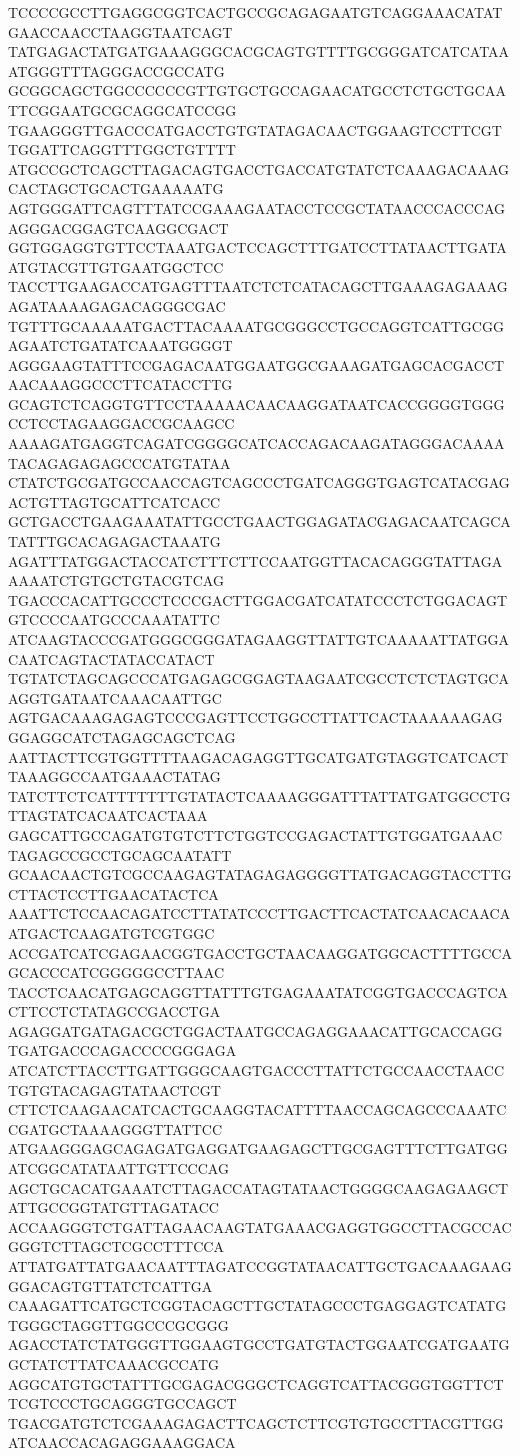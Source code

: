 TCCCCGCCTTGAGGCGGTCACTGCCGCAGAGAATGTCAGGAAACATATGAACCAACCTAAGGTAATCAGT
TATGAGACTATGATGAAAGGGCACGCAGTGTTTTGCGGGATCATCATAAATGGGTTTAGGGACCGCCATG
GCGGCAGCTGGCCCCCCGTTGTGCTGCCAGAACATGCCTCTGCTGCAATTCGGAATGCGCAGGCATCCGG
TGAAGGGTTGACCCATGACCTGTGTATAGACAACTGGAAGTCCTTCGTTGGATTCAGGTTTGGCTGTTTT
ATGCCGCTCAGCTTAGACAGTGACCTGACCATGTATCTCAAAGACAAAGCACTAGCTGCACTGAAAAATG
AGTGGGATTCAGTTTATCCGAAAGAATACCTCCGCTATAACCCACCCAGAGGGACGGAGTCAAGGCGACT
GGTGGAGGTGTTCCTAAATGACTCCAGCTTTGATCCTTATAACTTGATAATGTACGTTGTGAATGGCTCC
TACCTTGAAGACCATGAGTTTAATCTCTCATACAGCTTGAAAGAGAAAGAGATAAAAGAGACAGGGCGAC
TGTTTGCAAAAATGACTTACAAAATGCGGGCCTGCCAGGTCATTGCGGAGAATCTGATATCAAATGGGGT
AGGGAAGTATTTCCGAGACAATGGAATGGCGAAAGATGAGCACGACCTAACAAAGGCCCTTCATACCTTG
GCAGTCTCAGGTGTTCCTAAAAACAACAAGGATAATCACCGGGGTGGGCCTCCTAGAAGGACCGCAAGCC
AAAAGATGAGGTCAGATCGGGGCATCACCAGACAAGATAGGGACAAAATACAGAGAGAGCCCATGTATAA
CTATCTGCGATGCCAACCAGTCAGCCCTGATCAGGGTGAGTCATACGAGACTGTTAGTGCATTCATCACC
GCTGACCTGAAGAAATATTGCCTGAACTGGAGATACGAGACAATCAGCATATTTGCACAGAGACTAAATG
AGATTTATGGACTACCATCTTTCTTCCAATGGTTACACAGGGTATTAGAAAAATCTGTGCTGTACGTCAG
TGACCCACATTGCCCTCCCGACTTGGACGATCATATCCCTCTGGACAGTGTCCCCAATGCCCAAATATTC
ATCAAGTACCCGATGGGCGGGATAGAAGGTTATTGTCAAAAATTATGGACAATCAGTACTATACCATACT
TGTATCTAGCAGCCCATGAGAGCGGAGTAAGAATCGCCTCTCTAGTGCAAGGTGATAATCAAACAATTGC
AGTGACAAAGAGAGTCCCGAGTTCCTGGCCTTATTCACTAAAAAAGAGGGAGGCATCTAGAGCAGCTCAG
AATTACTTCGTGGTTTTAAGACAGAGGTTGCATGATGTAGGTCATCACTTAAAGGCCAATGAAACTATAG
TATCTTCTCATTTTTTTGTATACTCAAAAGGGATTTATTATGATGGCCTGTTAGTATCACAATCACTAAA
GAGCATTGCCAGATGTGTCTTCTGGTCCGAGACTATTGTGGATGAAACTAGAGCCGCCTGCAGCAATATT
GCAACAACTGTCGCCAAGAGTATAGAGAGGGGTTATGACAGGTACCTTGCTTACTCCTTGAACATACTCA
AAATTCTCCAACAGATCCTTATATCCCTTGACTTCACTATCAACACAACAATGACTCAAGATGTCGTGGC
ACCGATCATCGAGAACGGTGACCTGCTAACAAGGATGGCACTTTTGCCAGCACCCATCGGGGGCCTTAAC
TACCTCAACATGAGCAGGTTATTTGTGAGAAATATCGGTGACCCAGTCACTTCCTCTATAGCCGACCTGA
AGAGGATGATAGACGCTGGACTAATGCCAGAGGAAACATTGCACCAGGTGATGACCCAGACCCCGGGAGA
ATCATCTTACCTTGATTGGGCAAGTGACCCTTATTCTGCCAACCTAACCTGTGTACAGAGTATAACTCGT
CTTCTCAAGAACATCACTGCAAGGTACATTTTAACCAGCAGCCCAAATCCGATGCTAAAAGGGTTATTCC
ATGAAGGGAGCAGAGATGAGGATGAAGAGCTTGCGAGTTTCTTGATGGATCGGCATATAATTGTTCCCAG
AGCTGCACATGAAATCTTAGACCATAGTATAACTGGGGCAAGAGAAGCTATTGCCGGTATGTTAGATACC
ACCAAGGGTCTGATTAGAACAAGTATGAAACGAGGTGGCCTTACGCCACGGGTCTTAGCTCGCCTTTCCA
ATTATGATTATGAACAATTTAGATCCGGTATAACATTGCTGACAAAGAAGGGACAGTGTTATCTCATTGA
CAAAGATTCATGCTCGGTACAGCTTGCTATAGCCCTGAGGAGTCATATGTGGGCTAGGTTGGCCCGCGGG
AGACCTATCTATGGGTTGGAAGTGCCTGATGTACTGGAATCGATGAATGGCTATCTTATCAAACGCCATG
AGGCATGTGCTATTTGCGAGACGGGCTCAGGTCATTACGGGTGGTTCTTCGTCCCTGCAGGGTGCCAGCT
TGACGATGTCTCGAAAGAGACTTCAGCTCTTCGTGTGCCTTACGTTGGATCAACCACAGAGGAAAGGACA
